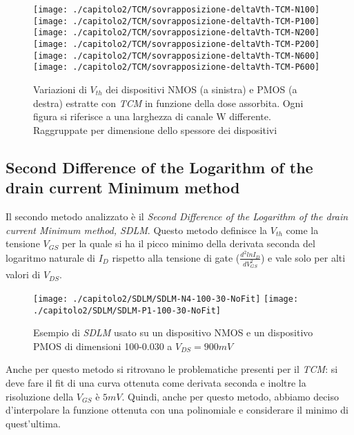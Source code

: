 \begin{figure}[H]
  \centering
  \texttt{[image: ./capitolo2/TCM/sovrapposizione-deltaVth-TCM-N100]}
  \texttt{[image: ./capitolo2/TCM/sovrapposizione-deltaVth-TCM-P100]}
  \texttt{[image: ./capitolo2/TCM/sovrapposizione-deltaVth-TCM-N200]}
  \texttt{[image: ./capitolo2/TCM/sovrapposizione-deltaVth-TCM-P200]}
  \texttt{[image: ./capitolo2/TCM/sovrapposizione-deltaVth-TCM-N600]}
  \texttt{[image: ./capitolo2/TCM/sovrapposizione-deltaVth-TCM-P600]}

  \caption[Dati $\Delta V_{th}$ estratti con TCM]{Variazioni di $V_{th}$ dei dispositivi NMOS (a sinistra) e PMOS (a destra) estratte con \emph{TCM} in funzione della dose assorbita. Ogni figura si riferisce a una larghezza di canale W differente. Raggruppate per dimensione dello spessore dei dispositivi}
  \label{fig:deltaVthTCM}
\end{figure}

\subsection[SDLM]{Second Difference of the Logarithm of the drain current Minimum method}
Il secondo metodo analizzato è il \emph{Second Difference of the Logarithm of the drain current Minimum method, SDLM}. Questo metodo definisce la $V_{th}$ come la tensione $V_{GS}$ per la quale si ha il picco minimo della derivata seconda del logaritmo naturale di $I_D$ rispetto alla tensione di gate ($\frac{d^2lnI_D}{dV_{GS}^2}$) e vale solo per alti valori di $V_{DS}$\cite{art1}.


\begin{figure}[H]
  \centering
  \texttt{[image: ./capitolo2/SDLM/SDLM-N4-100-30-NoFit]}
  \texttt{[image: ./capitolo2/SDLM/SDLM-P1-100-30-NoFit]}
  \caption[Applicazione SDLM senza fit polinomiale]{Esempio di \emph{SDLM} usato su un dispositivo NMOS e un dispositivo PMOS di dimensioni 100-0.030 a $V_{DS} = 900 mV$}
\end{figure}

Anche per questo metodo si ritrovano le problematiche presenti per il \emph{TCM}: si deve fare il fit di una curva ottenuta come derivata seconda e inoltre la risoluzione della $V_{GS}$ è $5mV$.
Quindi, anche per questo metodo, abbiamo deciso d'interpolare la funzione ottenuta con una polinomiale e considerare il minimo di quest'ultima.

